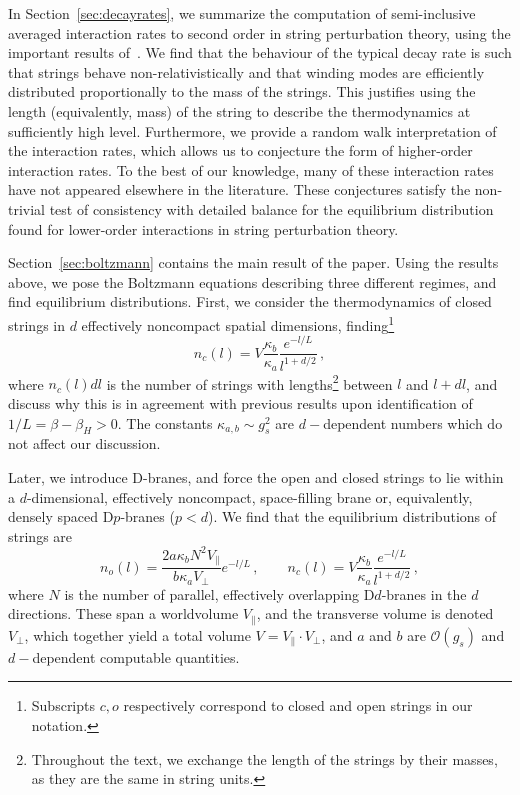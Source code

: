 \documentclass[a4paper,11pt]{article}
\begin{document}
In Section~\ref{sec:decayrates}, we summarize the computation of semi-inclusive averaged interaction rates to second order in string perturbation theory, using the important results of~\cite{Manes:2001cs}.
We find that the behaviour of the typical decay rate is such that strings behave non-relativistically and that winding modes are efficiently distributed proportionally to the mass of the strings.
This justifies using the length (equivalently, mass) of the string to describe the thermodynamics at sufficiently high level.
Furthermore, we provide a random walk interpretation of the interaction rates, which allows us to conjecture the form of higher-order interaction rates.
To the best of our knowledge, many of these interaction rates have not appeared elsewhere in the literature.
These conjectures satisfy the non-trivial test of consistency with detailed balance for the equilibrium distribution found for lower-order interactions in string perturbation theory.

Section~\ref{sec:boltzmann} contains the main result of the paper. Using the results above, we pose the Boltzmann equations describing three different regimes, and find equilibrium distributions.
First, we consider the thermodynamics of closed strings in $d$ effectively noncompact spatial dimensions, finding\footnote{Subscripts $c,o$ respectively correspond to closed and open strings in our notation.}
\begin{equation}\label{eq:onlyclosed}
     n_c(l) = V \frac{\kappa_b}{\kappa_a}\frac{e^{-l/L}}{l^{1+d/2}} \, ,
\end{equation}
where $n_c(l)dl$ is the number of strings with lengths\footnote{Throughout the text, we exchange the length of the strings by their masses, as they are the same in string units.} between $l$ and $l+dl$, and discuss why this is in agreement with previous results upon identification of $1/L=\beta-\beta_H>0$.
The constants $\kappa_{a,b} \sim g_s^2$ are $d-$dependent numbers which do not affect our discussion.

Later, we introduce D-branes, and force the open and closed strings to lie within a $d$-dimensional, effectively noncompact, space-filling brane or, equivalently, densely spaced D$p$-branes ($p<d$).
We find that the equilibrium distributions of strings are
\begin{equation}\label{eq:confined}
     n_o(l)=\frac{2a \kappa_b N^2V_\parallel}{b \kappa_aV_\perp}e^{-l/L}\, , \qquad 
     n_c(l) = V \frac{\kappa_b}{\kappa_a}\frac{e^{-l/L}}{l^{1+d/2}} \, ,
\end{equation}
where $N$ is the number of parallel, effectively overlapping D$d$-branes in the $d$ directions.
These span a worldvolume $V_\parallel$, and the transverse volume is denoted $V_\perp$, which together yield a total volume $V=V_\parallel \cdot V_\perp$, and $a$ and $b$ are $\mathcal{O}(g_s)$ and $d-$dependent computable quantities.
\end{document}

